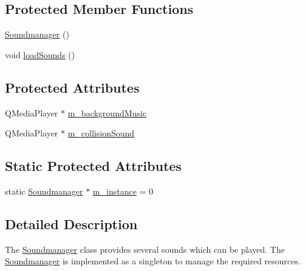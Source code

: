 \subsection*{Protected Member Functions}
\begin{DoxyCompactItemize}
\item 
\hyperlink{class_soundmanager_a8b484955e5732155f07099e53dca61e1}{Soundmanager} ()
\item 
void \hyperlink{class_soundmanager_a97874137f1bc5dcff106b0a5faeca828}{load\+Sounds} ()
\end{DoxyCompactItemize}
\subsection*{Protected Attributes}
\begin{DoxyCompactItemize}
\item 
Q\+Media\+Player $\ast$ \hyperlink{class_soundmanager_a39e32f7d94670486c52e78721a8f4faf}{m\+\_\+background\+Music}
\item 
Q\+Media\+Player $\ast$ \hyperlink{class_soundmanager_a824f9bfdbe61a7db3cb54cb87cb80268}{m\+\_\+collision\+Sound}
\end{DoxyCompactItemize}
\subsection*{Static Protected Attributes}
\begin{DoxyCompactItemize}
\item 
static \hyperlink{class_soundmanager}{Soundmanager} $\ast$ \hyperlink{class_soundmanager_a81105bb352bada9ff056335df0dd2bb3}{m\+\_\+instance} = 0
\end{DoxyCompactItemize}


\subsection{Detailed Description}
The \hyperlink{class_soundmanager}{Soundmanager} class provides several sounds which can be played.  The \hyperlink{class_soundmanager}{Soundmanager} is implemented as a singleton to manage the required resources. 


